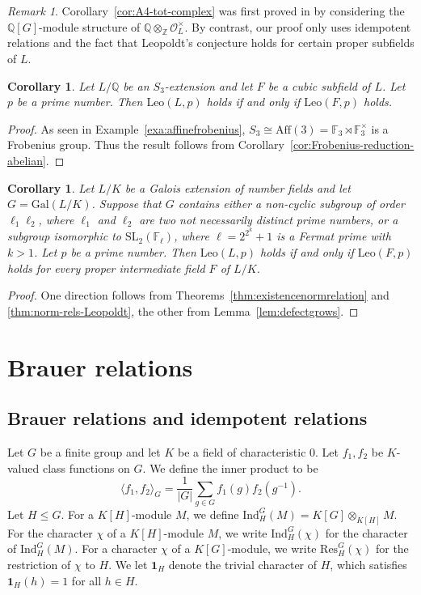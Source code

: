 \documentclass[12pt]{amsart}
\theoremstyle{plain}
\newtheorem{corollary}[theorem]{Corollary}
\theoremstyle{remark}
\newtheorem{remark}[theorem]{Remark}
\theoremstyle{definition}
\newcommand{\Z}{\mathbb{Z}}
\newcommand{\Q}{\mathbb{Q}}
\newcommand{\F}{\mathbb{F}}
\newcommand{\Aff}{\mathrm{Aff}}
\newcommand{\Gal}{\mathrm{Gal}}
\newcommand{\Res}{\mathrm{Res}}
\newcommand{\Ind}{\mathrm{Ind}}
\newcommand{\Leo}{\mathrm{Leo}}
\numberwithin{equation}{section}
\begin{document}
\begin{remark}
Corollary~\ref{cor:A4-tot-complex} was first proved in \cite[Th\'eor\`eme~2]{MR769790}
by considering the $\Q[G]$-module structure of $\Q \otimes_{\Z} \mathcal{O}_{L}^{\times}$.
By contrast, our proof only uses idempotent relations and the fact that Leopoldt's conjecture holds
for certain proper subfields of $L$.
\end{remark}

\begin{corollary}\label{cor:S3cubicleopoldt}
Let $L/\Q$ be an $S_{3}$-extension and let $F$ be a cubic subfield of $L$.
Let $p$ be a prime number. 
Then $\Leo(L,p)$ holds if and only if $\Leo(F,p)$ holds.
\end{corollary}

\begin{proof}
As seen in Example~\ref{exa:affinefrobenius}, $S_{3} \cong \Aff(3) = \F_{3} \rtimes \F_{3}^{\times}$ 
is a Frobenius group. Thus the result follows from Corollary~\ref{cor:Frobenius-reduction-abelian}.
\end{proof}

\begin{corollary}\label{cor:leopoldt-proper-subfields}
Let $L/K$ be a Galois extension of number fields and let $G=\Gal(L/K)$.
Suppose that $G$ contains either a non-cyclic subgroup of order $\ell_{1}\ell_{2}$,
where $\ell_{1}$ and $\ell_{2}$ are two not necessarily distinct prime numbers, or a subgroup 
isomorphic to $\mathrm{SL}_{2}(\F_{\ell})$, where $\ell = 2^{2^{k}}+1$ is a Fermat prime
with $k>1$. Let $p$ be a prime number. 
Then $\Leo(L,p)$ holds if and only if $\Leo(F,p)$ holds for every proper intermediate field $F$ of $L/K$.
\end{corollary}

\begin{proof}
One direction follows from Theorems~\ref{thm:existencenormrelation} and \ref{thm:norm-rels-Leopoldt}, the other from Lemma~\ref{lem:defectgrows}.
\end{proof}


\section{Brauer relations}\label{sec:Brauer}

\subsection{Brauer relations and idempotent relations}\label{subsec:brauer-vs-idempotent-relations}
Let $G$ be a finite group and let $K$ be a field of characteristic $0$.
Let $f_{1},f_{2}$ be $K$-valued class functions on $G$.
We define the inner product to be
\[
\langle f_{1}, f_{2} \rangle_{G} = \frac{1}{|G|}\sum_{g \in G}f_{1}(g)f_{2}(g^{-1}).
\]
Let $H \leq G$.
For a $K[H]$-module $M$, we define
$\Ind^{G}_{H}(M) = K[G] \otimes_{K[H]} M$.
For the character $\chi$ of a $K[H]$-module $M$, 
we write $\Ind^{G}_{H}(\chi)$ for the character of $\Ind^{G}_{H}(M)$.
For a character $\chi$ of a $K[G]$-module, we write $\Res^{G}_{H}(\chi)$
for the restriction of $\chi$ to $H$.
We let $\mathbf{1}_{H}$ denote the trivial character of $H$, which satisfies 
$\mathbf{1}_{H}(h)=1$ for all $h \in H$.
\end{document}
